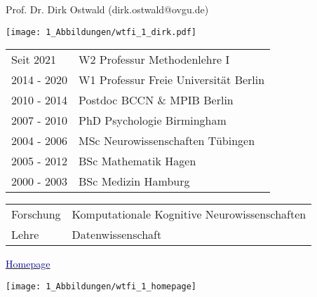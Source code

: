 \documentclass[
  8pt,
  ignorenonframetext,
]{beamer}
\begin{document}
\begin{frame}[plain]{}
\protect\hypertarget{section-3}{}
\vfill
\begin{large}
Prof. Dr. Dirk Ostwald (dirk.ostwald@ovgu.de)
\end{large}
\vspace{.7cm}

\begin{minipage}{.3\linewidth}
\begin{center}
\texttt{[image: 1\_Abbildungen/wtfi\_1\_dirk.pdf]}
\end{center}
\end{minipage}
\begin{minipage}{.7\linewidth}
\begin{small}
\renewcommand{\arraystretch}{1.3}
\begin{tabular}{ll}
Seit 2021   & W2 Professur Methodenlehre I              \\
2014 - 2020 & W1 Professur Freie Universität Berlin     \\
2010 - 2014 & Postdoc BCCN \& MPIB Berlin               \\
2007 - 2010 & PhD Psychologie Birmingham                \\
2004 - 2006 & MSc Neurowissenschaften Tübingen          \\
2005 - 2012 & BSc Mathematik Hagen                      \\
2000 - 2003 & BSc Medizin Hamburg                       \\
\end{tabular}
\end{small}
\end{minipage}
\vspace{.7cm}

\begin{large}
\begin{tabular}{ll}
Forschung   & Komputationale Kognitive Neurowissenschaften  \\
Lehre       & Datenwissenschaft
\end{tabular}
\end{large}
\vfill
\end{frame}

\begin{frame}{}
\protect\hypertarget{section-4}{}
\href{https://www.ipsy.ovgu.de/methodenlehre_I-path-980,1404.html}{\textcolor{darkblue}{Homepage}}

\begin{center}\texttt{[image: 1\_Abbildungen/wtfi\_1\_homepage]} \end{center}
\end{frame}
\end{document}
